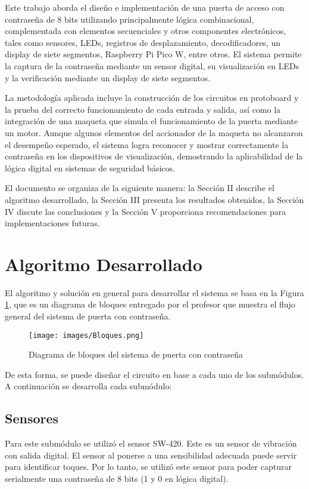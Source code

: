 \documentclass[conference]{IEEEtran}  %
\begin{document}
Este trabajo aborda el diseño e implementación de una puerta de acceso con contraseña de 8 bits utilizando principalmente lógica combinacional, complementada con elementos secuenciales y otros componentes electrónicos, tales como sensores, LEDs, registros de desplazamiento, decodificadores, un display de siete segmentos, Raspberry Pi Pico W, entre otros. El sistema permite la captura de la contraseña mediante un sensor digital, su visualización en LEDs y la verificación mediante un display de siete segmentos.

La metodología aplicada incluye la construcción de los circuitos en protoboard y la prueba del correcto funcionamiento de cada entrada y salida, así como la integración de una maqueta que simula el funcionamiento de la puerta mediante un motor. Aunque algunos elementos del accionador de la maqueta no alcanzaron el desempeño esperado, el sistema logra reconocer y mostrar correctamente la contraseña en los dispositivos de visualización, demostrando la aplicabilidad de la lógica digital en sistemas de seguridad básicos.

El documento se organiza de la siguiente manera: la Sección II describe el algoritmo desarrollado, la Sección III presenta los resultados obtenidos, la Sección IV discute las conclusiones y la Sección V proporciona recomendaciones para implementaciones futuras.

\section{Algoritmo Desarrollado}
El algoritmo y solución en general para desarrollar el sistema se basa en la Figura \ref{fig:bloques}, que es un diagrama de bloques entregado por el profesor que muestra el flujo general del sistema de puerta con contraseña.

\begin{figure}[h]
    \centering
    \texttt{[image: images/Bloques.png]}
    \caption{Diagrama de bloques del sistema de puerta con contraseña}
    \label{fig:bloques}
\end{figure}

De esta forma, se puede diseñar el circuito en base a cada uno de los submódulos. A continuación se desarrolla cada submódulo:

\subsection{Sensores}

Para este submódulo se utilizó el sensor SW-420. Este es un sensor de vibración con salida digital. El sensor al ponerse a una sensibilidad adecuada puede servir para identificar toques. Por lo tanto, se utilizó este sensor para poder capturar serialmente una contraseña de 8 bits (1 y 0 en lógica digital).
\end{document}
